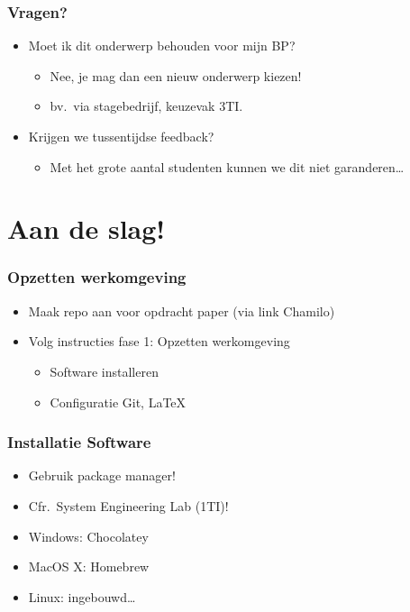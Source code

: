 \documentclass[aspectratio=169]{beamer}
\begin{document}
\begin{frame}
  \frametitle{Vragen?}

  \begin{itemize}
    \item Moet ik dit onderwerp behouden voor mijn BP?
          \begin{itemize}
            \item Nee, je mag dan een nieuw onderwerp kiezen!
            \item bv.\ via stagebedrijf, keuzevak 3TI.
          \end{itemize}
    \item Krijgen we tussentijdse feedback?
          \begin{itemize}
            \item Met het grote aantal studenten kunnen we dit niet garanderen\ldots
          \end{itemize}
  \end{itemize}
\end{frame}

\section{Aan de slag!}

\begin{frame}
  \frametitle{Opzetten werkomgeving}

  \begin{itemize}
    \item Maak repo aan voor opdracht paper (via link Chamilo)
    \item Volg instructies fase 1: Opzetten werkomgeving
          \begin{itemize}
            \item Software installeren
            \item Configuratie Git, LaTeX
          \end{itemize}
  \end{itemize}
\end{frame}


\begin{frame}
  \frametitle{Installatie Software}

  \begin{itemize}
    \item Gebruik package manager!
    \item Cfr.\ System Engineering Lab (1TI)!
    \item Windows: Chocolatey
    \item MacOS X: Homebrew
    \item Linux: ingebouwd\ldots
  \end{itemize}
\end{frame}
\end{document}
